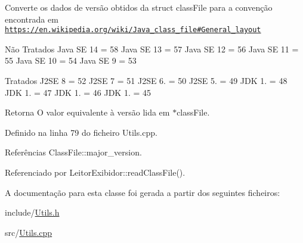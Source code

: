 Converte os dados de versão obtidos da struct class\+File para a convenção encontrada em \href{https://en.wikipedia.org/wiki/Java_class_file#General_layout}{\tt https\+://en.\+wikipedia.\+org/wiki/\+Java\+\_\+class\+\_\+file\#\+General\+\_\+layout}

Não Tratados Java SE 14 = 58 Java SE 13 = 57 Java SE 12 = 56 Java SE 11 = 55 Java SE 10 = 54 Java SE 9 = 53

Tratados J2\+SE 8 = 52 J2\+SE 7 = 51 J2\+SE 6. = 50 J2\+SE 5. = 49 J\+DK 1. = 48 J\+DK 1. = 47 J\+DK 1. = 46 J\+DK 1. = 45 \begin{DoxyReturn}{Retorna}
O valor equivalente à versão lida em $\ast$class\+File. 
\end{DoxyReturn}


Definido na linha 79 do ficheiro Utils.\+cpp.



Referências Class\+File\+::major\+\_\+version.



Referenciado por Leitor\+Exibidor\+::read\+Class\+File().



A documentação para esta classe foi gerada a partir dos seguintes ficheiros\+:\begin{DoxyCompactItemize}
\item 
include/\hyperlink{Utils_8h}{Utils.\+h}\item 
src/\hyperlink{Utils_8cpp}{Utils.\+cpp}\end{DoxyCompactItemize}
